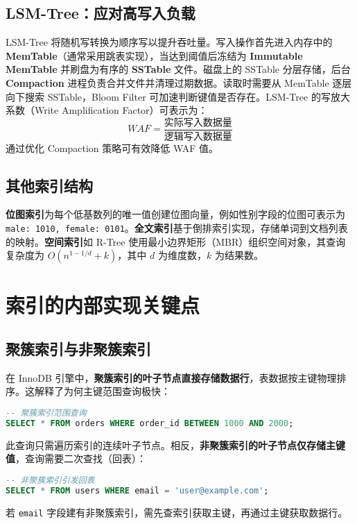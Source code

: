 \section{LSM-Tree：应对高写入负载}
LSM-Tree 将随机写转换为顺序写以提升吞吐量。写入操作首先进入内存中的 \textbf{MemTable}（通常采用跳表实现），当达到阈值后冻结为 \textbf{Immutable MemTable} 并刷盘为有序的 \textbf{SSTable} 文件。磁盘上的 SSTable 分层存储，后台 \textbf{Compaction} 进程负责合并文件并清理过期数据。读取时需要从 MemTable 逐层向下搜索 SSTable，Bloom Filter 可加速判断键值是否存在。LSM-Tree 的写放大系数（Write Amplification Factor）可表示为：
$$ WAF = \frac{\text{实际写入数据量}}{\text{逻辑写入数据量}} $$
通过优化 Compaction 策略可有效降低 WAF 值。\par
\section{其他索引结构}
\textbf{位图索引}为每个低基数列的唯一值创建位图向量，例如性别字段的位图可表示为 \texttt{male: 1010, female: 0101}。\textbf{全文索引}基于倒排索引实现，存储单词到文档列表的映射。\textbf{空间索引}如 R-Tree 使用最小边界矩形（MBR）组织空间对象，其查询复杂度为 $O(n^{1-1/d}+k)$，其中 $d$ 为维度数，$k$ 为结果数。\par
\chapter{索引的内部实现关键点}
\section{聚簇索引与非聚簇索引}
在 InnoDB 引擎中，\textbf{聚簇索引的叶子节点直接存储数据行}，表数据按主键物理排序。这解释了为何主键范围查询极快：\par
\begin{lstlisting}[language=sql]
-- 聚簇索引范围查询
SELECT * FROM orders WHERE order_id BETWEEN 1000 AND 2000;
\end{lstlisting}
此查询只需遍历索引的连续叶子节点。相反，\textbf{非聚簇索引的叶子节点仅存储主键值}，查询需要二次查找（回表）：\par
\begin{lstlisting}[language=sql]
-- 非聚簇索引引发回表
SELECT * FROM users WHERE email = 'user@example.com';
\end{lstlisting}
若 \texttt{email} 字段建有非聚簇索引，需先查索引获取主键，再通过主键获取数据行。\par
